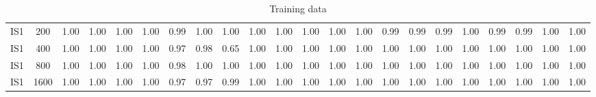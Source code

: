 \documentclass[10pt]{article}
\begin{document}
\begin{table}
\begin{tabular}{ cc||c c c c | c c c c | c c c c | c c c c| c c c c}
 					IS1 & 200 & 1.00 & 1.00 & 1.00 & 1.00 & 0.99 & 1.00 & 1.00 & 1.00& 1.00 & 1.00 & 1.00 & 1.00& 0.99 & 0.99 & 0.99 & 1.00 & 0.99 & 0.99 & 1.00 & 1.00\\ 
 					IS1 & 400 & 1.00 & 1.00 & 1.00 & 1.00 & 0.97 & 0.98 & 0.65 & 1.00& 1.00 & 1.00 & 1.00 & 1.00& 1.00 & 1.00 & 1.00 & 1.00 & 1.00 & 1.00 & 1.00 & 1.00\\ 
 					IS1 & 800 & 1.00 & 1.00 & 1.00 & 1.00 & 0.98 & 1.00 & 1.00 & 1.00& 1.00 & 1.00 & 1.00 & 1.00& 1.00 & 1.00 & 1.00 & 1.00 & 1.00 & 1.00 & 1.00 & 1.00\\ 
 					IS1 & 1600 & 1.00 & 1.00 & 1.00 & 1.00 & 0.97 & 0.97 & 0.99 & 1.00& 1.00 & 1.00 & 1.00 & 1.00& 1.00 & 1.00 & 1.00 & 1.00 & 1.00 & 1.00 & 1.00 & 1.00\\ \hline
 \hline
  \end{tabular}
  \caption{Training data}
\end{table}
\end{document}
